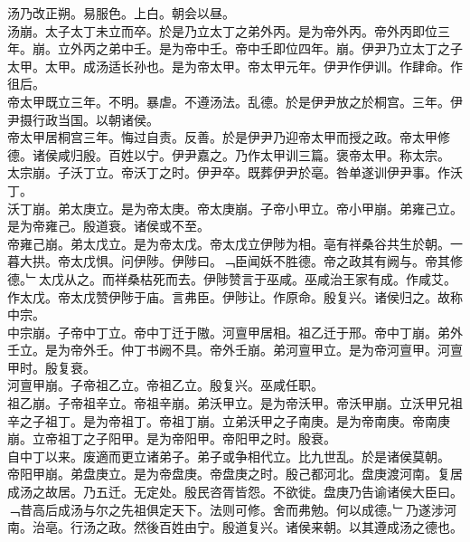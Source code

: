 \documentclass{zhvt-classic}
\begin{document}
\hspace*{2em}汤乃改正朔。易服色。上白。朝会以昼。\\
\hspace*{2em}汤崩。太子太丁未立而卒。於是乃立太丁之弟外丙。是为帝外丙。帝外丙即位三年。崩。立外丙之弟中壬。是为帝中壬。帝中壬即位四年。崩。伊尹乃立太丁之子太甲。太甲。成汤适长孙也。是为帝太甲。帝太甲元年。伊尹作伊训。作肆命。作徂后。\\
\hspace*{2em}帝太甲既立三年。不明。暴虐。不遵汤法。乱德。於是伊尹放之於桐宫。三年。伊尹摄行政当国。以朝诸侯。\\
\hspace*{2em}帝太甲居桐宫三年。悔过自责。反善。於是伊尹乃迎帝太甲而授之政。帝太甲修德。诸侯咸归殷。百姓以宁。伊尹嘉之。乃作太甲训三篇。褒帝太甲。称太宗。\\
\hspace*{2em}太宗崩。子沃丁立。帝沃丁之时。伊尹卒。既葬伊尹於亳。咎单遂训伊尹事。作沃丁。\\
\hspace*{2em}沃丁崩。弟太庚立。是为帝太庚。帝太庚崩。子帝小甲立。帝小甲崩。弟雍己立。是为帝雍己。殷道衰。诸侯或不至。\\
\hspace*{2em}帝雍己崩。弟太戊立。是为帝太戊。帝太戊立伊陟为相。亳有祥桑谷共生於朝。一暮大拱。帝太戊惧。问伊陟。伊陟曰。﹁臣闻妖不胜德。帝之政其有阙与。帝其修德。﹂太戊从之。而祥桑枯死而去。伊陟赞言于巫咸。巫咸治王家有成。作咸艾。作太戊。帝太戊赞伊陟于庙。言弗臣。伊陟让。作原命。殷复兴。诸侯归之。故称中宗。\\
\hspace*{2em}中宗崩。子帝中丁立。帝中丁迁于隞。河亶甲居相。祖乙迁于邢。帝中丁崩。弟外壬立。是为帝外壬。仲丁书阙不具。帝外壬崩。弟河亶甲立。是为帝河亶甲。河亶甲时。殷复衰。\\
\hspace*{2em}河亶甲崩。子帝祖乙立。帝祖乙立。殷复兴。巫咸任职。\\
\hspace*{2em}祖乙崩。子帝祖辛立。帝祖辛崩。弟沃甲立。是为帝沃甲。帝沃甲崩。立沃甲兄祖辛之子祖丁。是为帝祖丁。帝祖丁崩。立弟沃甲之子南庚。是为帝南庚。帝南庚崩。立帝祖丁之子阳甲。是为帝阳甲。帝阳甲之时。殷衰。\\
\hspace*{2em}自中丁以来。废適而更立诸弟子。弟子或争相代立。比九世乱。於是诸侯莫朝。\\
\hspace*{2em}帝阳甲崩。弟盘庚立。是为帝盘庚。帝盘庚之时。殷己都河北。盘庚渡河南。复居成汤之故居。乃五迁。无定处。殷民咨胥皆怨。不欲徙。盘庚乃告谕诸侯大臣曰。﹁昔高后成汤与尔之先祖俱定天下。法则可修。舍而弗勉。何以成德。﹂乃遂涉河南。治亳。行汤之政。然後百姓由宁。殷道复兴。诸侯来朝。以其遵成汤之德也。\\
\end{document}
